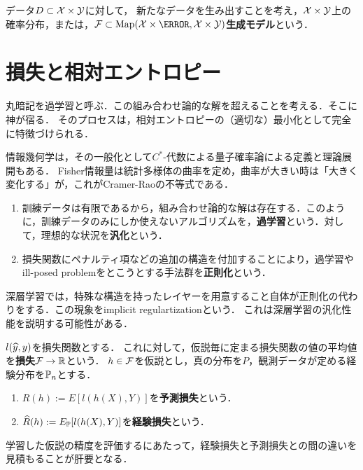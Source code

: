 \documentclass[uplatex,dvipdfmx]{jsreport}
\begin{document}
\begin{definition}
    データ$D\subset\mathcal{X}\times\mathcal{Y}$に対して，
    新たなデータを生み出すことを考え，$\mathcal{X}\times\mathcal{Y}$上の確率分布，または，$\F\subset\Map(\X\times\yocto,\X\times\Y)$\textbf{生成モデル}という．
\end{definition}

\section{損失と相対エントロピー}

\begin{tcolorbox}[colframe=ForestGreen, colback=ForestGreen!10!white,breakable,colbacktitle=ForestGreen!40!white,coltitle=black,fonttitle=\bfseries\sffamily,
title=]
    丸暗記を過学習と呼ぶ．この組み合わせ論的な解を超えることを考える．そこに神が宿る．
    そのプロセスは，相対エントロピーの（適切な）最小化として完全に特徴づけられる．

    情報幾何学は，その一般化として$C^*$-代数による量子確率論による定義と理論展開もある．
    Fisher情報量は統計多様体の曲率を定め，曲率が大きい時は「大きく変化する」が，これがCramer-Raoの不等式である．
\end{tcolorbox}

\begin{definition}\mbox{}
    \begin{enumerate}
        \item 訓練データは有限であるから，組み合わせ論的な解は存在する．このように，訓練データのみにしか使えないアルゴリズムを，\textbf{過学習}という．対して，理想的な状況を\textbf{汎化}という．
        \item 損失関数にペナルティ項などの追加の構造を付加することにより，過学習やill-posed problemをとこうとする手法群を\textbf{正則化}という．
    \end{enumerate}
\end{definition}
\begin{remark}
    深層学習では，特殊な構造を持ったレイヤーを用意すること自体が正則化の代わりをする．この現象をimplicit regulartizationという．
    これは深層学習の汎化性能を説明する可能性がある．
\end{remark}

\begin{definition}
    $l(\widehat{y},y)$を損失関数とする．
    これに対して，仮説毎に定まる損失関数の値の平均値を\textbf{損失}$\mathcal{F}\to\mathbb{R}$という．
    $h\in\mathcal{F}$を仮説とし，真の分布を$P$，観測データが定める経験分布を$\mathbb{P}_n$とする．
    \begin{enumerate}
        \item $R(h):=E[l(h(X),Y)]$を\textbf{予測損失}という．
        \item $\widehat{R}(h):=E_{\mathbb{P}}[l(h(X),Y)]$を\textbf{経験損失}という．
    \end{enumerate}
\end{definition}
\begin{remarks}
    学習した仮説の精度を評価するにあたって，経験損失と予測損失との間の違いを見積もることが肝要となる．
\end{remarks}
\end{document}
